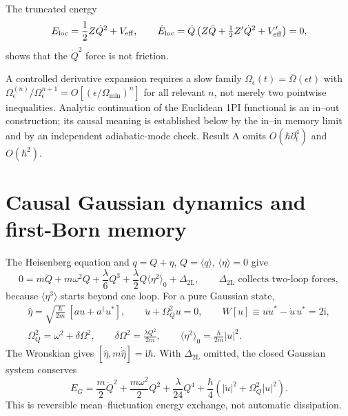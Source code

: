 \documentclass[9pt]{extarticle}
\newcommand{\ii}{\mathrm i}
\newcommand{\Om}{\Omega}
\newcommand{\Dtwo}{\Delta_{\mathrm{2L}}}
\begin{document}
The truncated energy
\begin{equation}
E_{\rm loc}=\frac12Z\dot Q^2+V_{\rm eff},
\qquad
\dot E_{\rm loc}=\dot Q\left(Z\ddot Q+\tfrac12Z'\dot Q^2+V'_{\rm eff}\right)=0,
\label{eq:Eloc}
\end{equation}
shows that the $\dot Q^2$ force is not friction.

\begin{validitybox}
A controlled derivative expansion requires a slow family $\Om_\epsilon(t)=\bar\Om(\epsilon t)$ with
$\Om_\epsilon^{(n)}/\Om_\epsilon^{n+1}=O[(\epsilon/\Om_{\min})^n]$ for all relevant $n$, not merely two pointwise inequalities.  Analytic continuation of the Euclidean 1PI functional is an in--out construction; its causal meaning is established below by the in--in memory limit and by an independent adiabatic-mode check.  Result A omits $O(\hbar\partial_t^4)$ and $O(\hbar^2)$.
\end{validitybox}

\section{Causal Gaussian dynamics and first-Born memory}

The Heisenberg equation and $q=Q+\eta$, $Q=\langle q\rangle$, $\langle\eta\rangle=0$ give
\begin{equation}
0=m\ddot Q+m\omega^2Q+\frac\lambda6Q^3+\frac\lambda2Q\langle\eta^2\rangle_0+\Dtwo,
\qquad \Dtwo\text{ collects two-loop forces},
\label{eq:mean}
\end{equation}
because $\langle\eta^3\rangle$ starts beyond one loop.  For a pure Gaussian state,
\begin{gather}
\hat\eta=\sqrt{\frac\hbar{2m}}\,[a u+a^\dagger u^*],
\qquad
\ddot u+\Om_Q^2u=0,
\qquad
W[u]\equiv u\dot u^*-\dot u\,u^*=2\ii,
\label{eq:mode}\\[-1mm]
\Om_Q^2=\omega^2+\delta\Om^2,
\qquad
\delta\Om^2=\frac{\lambda Q^2}{2m},
\qquad
\langle\eta^2\rangle_0=\frac\hbar{2m}|u|^2.
\label{eq:variance}
\end{gather}
The Wronskian gives $[\hat\eta,m\dot{\hat\eta}]=\ii\hbar$.  With $\Dtwo$ omitted, the closed Gaussian system conserves
\begin{equation}
E_G=\frac m2\dot Q^2+\frac{m\omega^2}{2}Q^2+\frac\lambda{24}Q^4
+\frac\hbar4\left(|\dot u|^2+\Om_Q^2|u|^2\right).
\label{eq:EG}
\end{equation}
This is reversible mean--fluctuation energy exchange, not automatic dissipation.
\end{document}
